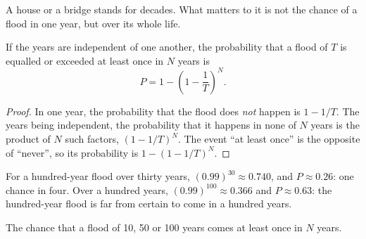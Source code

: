 A house or a bridge stands for decades. What matters to it is not the chance
of a flood in one year, but over its whole life.

\begin{proposition}\label{prop:g10:drainage-basins:chance}
If the years are independent of one another, the probability that a flood of
 $T$ is equalled or exceeded at least once in $N$ years is
\[
P = 1 - \left(1 - \frac{1}{T}\right)^{N}.
\]
\end{proposition}

\begin{proof}
In one year, the probability that the flood does \emph{not} happen is
$1 - 1/T$. The years being independent, the probability that it happens in
none of $N$ years is the product of $N$ such factors, $(1 - 1/T)^N$. The
event ``at least once'' is the opposite of ``never'', so its probability is
$1 - (1 - 1/T)^N$.
\end{proof}

For a hundred-year flood over thirty years, $(0.99)^{30} \approx 0.740$, and
$P \approx 0.26$: one chance in four. Over a hundred years, $(0.99)^{100}
\approx 0.366$ and $P \approx 0.63$: the hundred-year flood is far from
certain to come in a hundred years.

\begin{omfigure}

{\small The chance that a flood of  10, 50 or 100 years comes at
least once in $N$ years.}
\end{omfigure}

